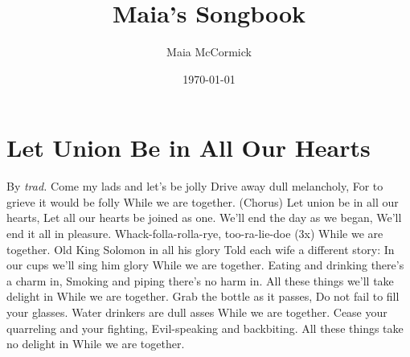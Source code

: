 \documentclass{book}%
\title{Maia's Songbook}%
\author{Maia McCormick}%
\date{\today}%
\begin{document}
%
\normalsize%
%
\maketitle%
\tableofcontents%
%
\chapter{Let Union Be in All Our Hearts}%
\label{letunionbeinallourhearts}%
By %
\textit{trad.}%
\newline%
Come my lads and let's be jolly\newline%
Drive away dull melancholy,\newline%
For to grieve it would be folly\newline%
While we are together.\newline%
\newline%
(Chorus)\newline%
Let union be in all our hearts,\newline%
Let all our hearts be joined as one.\newline%
We'll end the day as we began,\newline%
We'll end it all in pleasure.\newline%
Whack{-}folla{-}rolla{-}rye, too{-}ra{-}lie{-}doe (3x)\newline%
While we are together.\newline%
\newline%
Old King Solomon in all his glory\newline%
Told each wife a different story:\newline%
In our cups we'll sing him glory\newline%
While we are together.\newline%
\newline%
Eating and drinking there's a charm in,\newline%
Smoking and piping there's no harm in.\newline%
All these things we'll take delight in\newline%
While we are together.\newline%
\newline%
Grab the bottle as it passes,\newline%
Do not fail to fill your glasses.\newline%
Water drinkers are dull asses\newline%
While we are together.\newline%
\newline%
Cease your quarreling and your fighting,\newline%
Evil{-}speaking and backbiting.\newline%
All these things take no delight in\newline%
While we are together.\newline%
%
\end{document}
